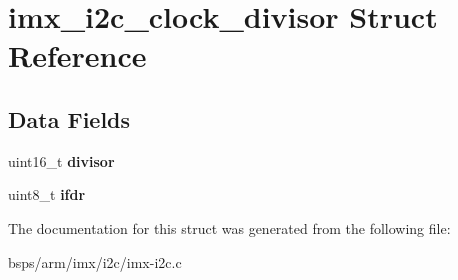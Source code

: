 \hypertarget{structimx__i2c__clock__divisor}{}\section{imx\+\_\+i2c\+\_\+clock\+\_\+divisor Struct Reference}
\label{structimx__i2c__clock__divisor}
\subsection*{Data Fields}
\begin{DoxyCompactItemize}
\item 
\mbox{\label{structimx__i2c__clock__divisor_af2d5c82fb2d330bc46eb3eb7a7d2ef22}} 
uint16\+\_\+t {\bfseries divisor}
\item 
\mbox{\label{structimx__i2c__clock__divisor_a157fb19d5d2baef231267a091a95aeec}} 
uint8\+\_\+t {\bfseries ifdr}
\end{DoxyCompactItemize}


The documentation for this struct was generated from the following file\+:\begin{DoxyCompactItemize}
\item 
bsps/arm/imx/i2c/imx-\/i2c.\+c\end{DoxyCompactItemize}
